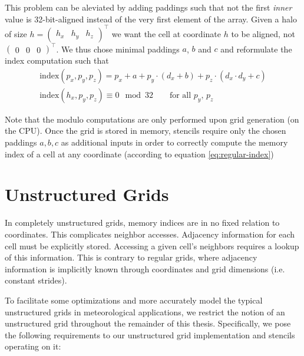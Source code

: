 This problem can be aleviated by adding paddings such that not the first \emph{inner} value is 32-bit-aligned instead of the very first element of the array. Given a halo of size $h = \begin{pmatrix}h_x & h_y & h_z\end{pmatrix}^\top$ we want the cell at coordinate $h$ to be aligned, not $\begin{pmatrix} 0 & 0 & 0\end{pmatrix}^\top$. We thus chose minimal paddings $a$, $b$ and $c$ and reformulate the index computation such that
\begin{gather}
	\text{index}\left(p_x, p_y, p_z\right) = p_x + a + p_y \cdot \left(d_x + b\right) + p_z \cdot \left(d_x \cdot d_y + c\right) \label{eq:regular-index}
	\\
	\text{index}\left(h_x, p_y, p_z\right) \equiv 0 \mod 32 \qquad \text{for all $p_y$, $p_z$}
\end{gather}

Note that the modulo computations are only performed upon grid generation (on the CPU). Once the grid is stored in memory, stencils require only the chosen paddings $a, b, c$ as additional inputs in order to correctly compute the memory index of a cell at any coordinate (according to equation \ref{eq:regular-index})

\section{Unstructured Grids}

In completely unstructured grids, 
memory indices are in no fixed relation to coordinates. This complicates neighbor accesses. Adjacency information for each cell must be explicitly stored. Accessing a given cell's neighbors requires a lookup of this information. This is contrary to regular grids, where adjacency information is implicitly known through coordinates and grid dimensions (i.e. constant strides).

To facilitate some optimizations and more accurately model the typical unstructured grids in meteorological applications, we restrict the notion of an unstructured grid throughout the remainder of this thesis. Specifically, we pose the following requirements to our unstructured grid implementation and stencils operating on it:

